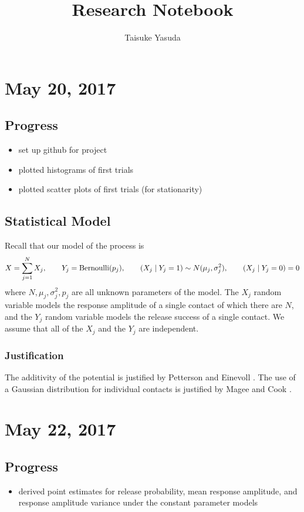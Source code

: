 \documentclass{article}
\title{Research Notebook}
\author{Taisuke Yasuda}
\begin{document}
\maketitle
\tableofcontents
\newpage

\section{May 20, 2017}
\subsection{Progress}
\begin{itemize}
  \item set up github for project
  \item plotted histograms of first trials
  \item plotted scatter plots of first trials (for stationarity)
\end{itemize}

\subsection{Statistical Model}
Recall that our model of the process is
\[
  X = \sum_{j=1}^N X_j,\qquad Y_j = \operatorname{Bernoulli}(p_j),\qquad (X_j\mid Y_j = 1)\sim N(\mu_j,\sigma_j^2), \qquad (X_j\mid Y_j = 0) = 0
\]
where $N, \mu_j, \sigma_j^2, p_j$ are all unknown parameters of the model. The $X_j$ random variable models the response amplitude of a single contact of which there are $N$, and the $Y_j$ random variable models the release success of a single contact. We assume that all of the $X_j$ and the $Y_j$ are independent.

\subsubsection{Justification}
The additivity of the potential is justified by Petterson and Einevoll \cite{pettersen2008amplitude}. The use of a Gaussian distribution for individual contacts is justified by Magee and Cook \cite{magee2000somatic}.

\section{May 22, 2017}
\subsection{Progress}
\begin{itemize}
  \item derived point estimates for release probability, mean response amplitude, and response amplitude variance under the constant parameter models
\end{itemize}
\end{document}
